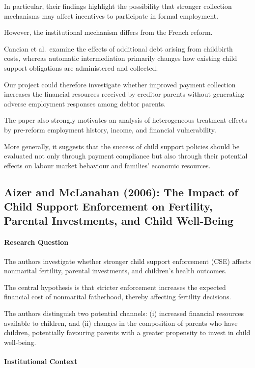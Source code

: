 \documentclass{article}
\begin{document}
In particular, their findings
highlight the possibility that
stronger collection mechanisms
may affect incentives to
participate in formal employment.

However, the institutional
mechanism differs from
the French reform.

Cancian et al.\ examine the
effects of additional debt
arising from childbirth costs,
whereas automatic intermediation
primarily changes how existing
child support obligations
are administered and collected.

Our project could therefore
investigate whether improved
payment collection increases
the financial resources
received by creditor parents
without generating adverse
employment responses among
debtor parents.

The paper also strongly motivates
an analysis of heterogeneous
treatment effects by pre-reform
employment history, income,
and financial vulnerability.

More generally, it suggests
that the success of child
support policies should be
evaluated not only through
payment compliance but also
through their potential effects
on labour market behaviour
and families' economic resources.


\subsection{Aizer and McLanahan (2006):
The Impact of Child Support Enforcement on Fertility,
Parental Investments, and Child Well-Being}

\paragraph{Research Question}

The authors investigate whether stronger child support
enforcement (CSE) affects nonmarital fertility, parental
investments, and children's health outcomes.

The central hypothesis is that stricter enforcement
increases the expected financial cost of nonmarital
fatherhood, thereby affecting fertility decisions.

The authors distinguish two potential channels:
(i) increased financial resources available to children,
and (ii) changes in the composition of parents who
have children, potentially favouring parents with
a greater propensity to invest in child well-being.

\paragraph{Institutional Context}
\end{document}
